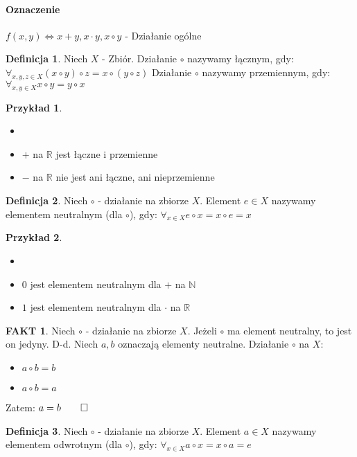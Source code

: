 \documentclass{article}
\theoremstyle{definition}
\newtheorem{de}{Definicja}[subsection]
\theoremstyle{definition}
\theoremstyle{definition}
\newtheorem{pk}{Przykład}[subsection]
\theoremstyle{definition}
\newtheorem*{fakt}{FAKT}
\begin{document}
\paragraph{Oznaczenie}

$f(x,y)\iff x+y, x\cdot y, x\circ y$ - Działanie ogólne

\begin{de}
Niech $X$ - Zbiór. Działanie $\circ$ nazywamy łącznym, gdy:
$\forall_{x,y,z\in X} (x\circ y)\circ z = x\circ (y\circ z)$
Działanie $\circ$ nazywamy przemiennym, gdy:
$\forall_{x,y\in X} x\circ y = y\circ x$
\end{de}

\begin{pk}
\begin{itemize}
\item[]
\item $+$ na $\mathbb{R}$ jest łączne i przemienne
\item $-$ na $\mathbb{R}$ nie jest ani łączne, ani nieprzemienne
\end{itemize}
\end{pk}

\begin{de}
Niech $\circ$ - działanie na zbiorze $X$. Element $e\in X$ nazywamy elementem neutralnym (dla $\circ$), gdy:
$\forall_{x\in X} e\circ x = x\circ e = x$
\end{de}

\begin{pk}
\begin{itemize}
\item[]
\item $0$ jest elementem neutralnym dla $+$ na $\mathbb{N}$
\item $1$ jest elementem neutralnym dla $\cdot$ na $\mathbb{R}$
\end{itemize}
\end{pk}

\begin{fakt}
Niech $\circ$ - działanie na zbiorze $X$. Jeżeli $\circ$ ma element neutralny, to jest on jedyny.
D-d. Niech $a,b$ oznaczają elementy neutralne. Działanie $\circ$ na $X$:
\begin{itemize}
\item $a\circ b = b$
\item $a\circ b = a$
\end{itemize}
Zatem: $a=b\qed$
\end{fakt}

\begin{de}
Niech $\circ$ - działanie na zbiorze $X$. Element $a\in X$ nazywamy elementem odwrotnym (dla $\circ$), gdy:
$\forall_{x\in X} a\circ x = x\circ a = e$
\end{de}
\end{document}
